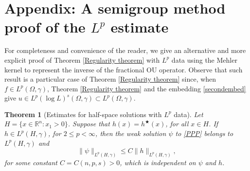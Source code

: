 \documentclass[a4paper,10pt,reqno]{amsart}
\newcommand{\R}{\mathbb{R}}
\newtheorem{theorem}{Theorem}[section]
\numberwithin{equation}{section}
\begin{document}
\section{Appendix: A semigroup method proof of the $L^p$ estimate}\label{Appendix}

For completeness and convenience of the reader, we give an alternative and more explicit proof of Theorem \ref{Regularity theorem} with $L^p$ data using the Mehler kernel to represent the inverse of the fractional
OU operator. Observe that such result is a particular case of Theorem \ref{Regularity theorem} since, when $f\in L^{p}(\Omega,\gamma)$, Theorem
\ref{Regularity theorem} and the embedding \eqref{secondembed} give $u\in L^{p}(\log L)^{s}(\Omega,\gamma)\subset L^{p}(\Omega,\gamma)$.

\begin{theorem}[Estimates for half-space solutions with $L^{p}$ data]\label{Regularity L^{p} theorem}
Let $H=\{x\in\R^n:x_{1}>0\}$. Suppose that $h(x)=h^{\bigstar}(x)$, for all $x\in H$. If $h\in L^{p}(H,\gamma)$, for $2\leq p<\infty$,
then the weak solution $\psi$ to \eqref{PPP} belongs to $L^{p}(H,\gamma)$ and
$$\|\psi\| _{L^{p}(H,\gamma)}\leq C\|h\|_{L^{p}(H,\gamma)},$$
for some constant $C=C(n,p,s)>0$, which is independent on $\psi$ and $h$.
\end{theorem}
\end{document}
